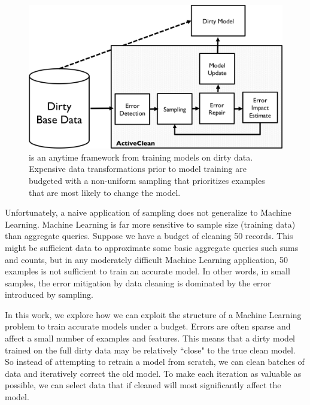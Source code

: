 \begin{figure}[t]
\centering
 \includegraphics[width=\columnwidth]{figs/arch.png}
 \caption{\sysfull is an anytime framework from training models on dirty data. Expensive data transformations prior to model training are budgeted with a non-uniform sampling that prioritizes examples that are most likely to change the model.  \label{sys-arch}}
\end{figure}

Unfortunately, a naive application of sampling does not generalize to Machine Learning.
Machine Learning is far more sensitive to sample size (training data) than aggregate queries.
Suppose we have a budget of cleaning 50 records.
This might be sufficient data to approximate some basic aggregate queries such sums and counts, but in any moderately difficult Machine Learning application, 50 examples is not sufficient to train an accurate model.
In other words, in small samples, the error mitigation by data cleaning is dominated by the error introduced by sampling.

In this work, we explore how we can exploit the structure of a Machine Learning problem to train accurate models under a budget.
Errors are often sparse and affect a small number of examples and features.
This means that a dirty model trained on the full dirty data may be relatively ``close" to the true clean model.
So instead of attempting to retrain a model from scratch, we can clean batches of data and iteratively correct the old model.
To make each iteration as valuable as possible, we can select data that if cleaned will most significantly affect the model.

